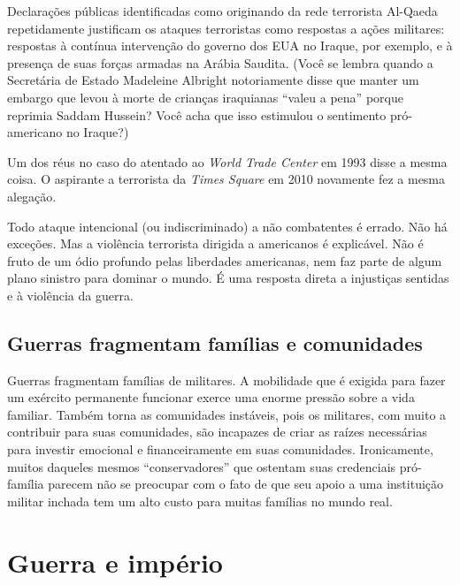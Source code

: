 Declarações públicas identificadas como originando da rede terrorista Al-Qaeda repetidamente justificam os ataques terroristas como respostas a ações militares: respostas à contínua intervenção do governo dos EUA no Iraque, por exemplo, e à presença de suas forças armadas na Arábia Saudita. (Você se lembra quando a Secretária de Estado Madeleine Albright notoriamente disse que manter um embargo que levou à morte de crianças iraquianas ``valeu a pena'' porque reprimia Saddam Hussein? Você acha que isso estimulou o sentimento pró-americano no Iraque?)

Um dos réus no caso do atentado ao \emph{World Trade Center} em 1993 disse a mesma coisa. O aspirante a terrorista da \emph{Times Square} em 2010 novamente fez a mesma alegação.

Todo ataque intencional (ou indiscriminado) a não combatentes é errado. Não há exceções. Mas a violência terrorista dirigida a americanos é explicável. Não é fruto de um ódio profundo pelas liberdades americanas, nem faz parte de algum plano sinistro para dominar o mundo. É uma resposta direta a injustiças sentidas e à violência da guerra.

\subsection*{Guerras fragmentam famílias e comunidades}

Guerras fragmentam famílias de militares. A mobilidade que é exigida para fazer um exército permanente funcionar exerce uma enorme pressão sobre a vida familiar. Também torna as comunidades instáveis, pois os militares, com muito a contribuir para suas comunidades, são incapazes de criar as raízes necessárias para investir emocional e financeiramente em suas comunidades. Ironicamente, muitos daqueles mesmos ``conservadores'' que ostentam suas credenciais pró-família parecem não se preocupar com o fato de que seu apoio a uma instituição militar inchada tem um alto custo para muitas famílias no mundo real.

\section{Guerra e império}

